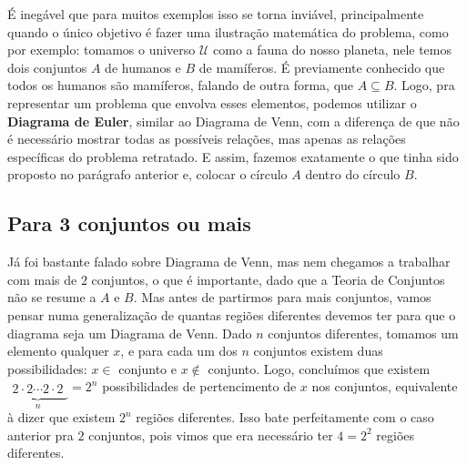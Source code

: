   
  É inegável que para muitos exemplos isso se torna inviável, principalmente quando o único objetivo é fazer uma ilustração matemática do problema, como por exemplo: tomamos o universo $\mathcal U$ como a fauna do nosso planeta, nele temos dois conjuntos $A$ de humanos e $B$ de mamíferos. É previamente conhecido que todos os humanos são mamíferos, falando de outra forma, que $A \subseteq B$. Logo, pra representar um problema que envolva esses elementos, podemos utilizar o \textbf{Diagrama de Euler}, similar ao Diagrama de Venn, com a diferença de que não é necessário mostrar todas as possíveis relações, mas apenas as relações específicas do problema retratado. E assim, fazemos exatamente o que tinha sido proposto no parágrafo anterior e, colocar o círculo $A$ dentro do círculo $B$.


  \subsection{Para 3 conjuntos ou mais}    
  Já foi bastante falado sobre Diagrama de Venn, mas nem chegamos a trabalhar com mais de $2$ conjuntos, o que é importante, dado que a Teoria de Conjuntos não se resume a $A$ e $B$. Mas antes de partirmos para mais conjuntos, vamos pensar numa generalização de quantas regiões diferentes devemos ter para que o diagrama seja um Diagrama de Venn. Dado $n$ conjuntos diferentes, tomamos um elemento qualquer $x$, e para cada um dos $n$ conjuntos existem duas possibilidades: $x \in $ conjunto e $x \notin $ conjunto. Logo, concluímos que existem $\underbrace{\begin{matrix} 2\cdot2\cdots2\cdot2\end{matrix}}_{n} = 2^n$ possibilidades de pertencimento de $x$ nos conjuntos, equivalente à dizer que existem $2^n$ regiões diferentes. Isso bate perfeitamente com o caso anterior pra $2$ conjuntos, pois vimos que era necessário ter $4=2^2$ regiões diferentes.

